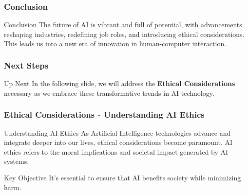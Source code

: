 \documentclass{beamer}
\begin{document}
\begin{frame}[fragile]
    \frametitle{Conclusion}
    \begin{block}{Conclusion}
        The future of AI is vibrant and full of potential, with advancements reshaping industries, redefining job roles, and introducing ethical considerations. This leads us into a new era of innovation in human-computer interaction.
    \end{block}
\end{frame}

\begin{frame}[fragile]
    \frametitle{Next Steps}
    \begin{block}{Up Next}
        In the following slide, we will address the \textbf{Ethical Considerations} necessary as we embrace these transformative trends in AI technology.
    \end{block}
\end{frame}

\begin{frame}[fragile]
    \frametitle{Ethical Considerations - Understanding AI Ethics}
    \begin{block}{Understanding AI Ethics}
        As Artificial Intelligence technologies advance and integrate deeper into our lives, ethical considerations become paramount. AI ethics refers to the moral implications and societal impact generated by AI systems. 
    \end{block}
    \begin{block}{Key Objective}
        It's essential to ensure that AI benefits society while minimizing harm.
    \end{block}
\end{frame}
\end{document}
